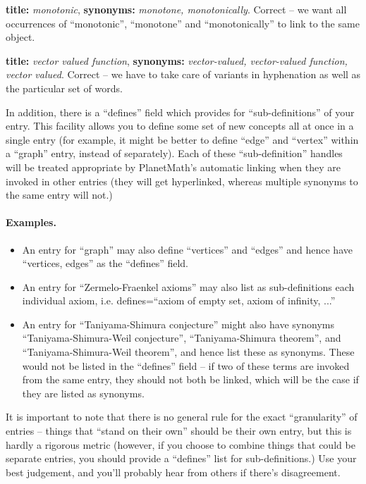 {\bf title:} \emph{monotonic}, {\bf synonyms:} \emph{monotone,
monotonically}. Correct -- we want all occurrences of ``monotonic'',
``monotone'' and ``monotonically'' to link to the same object.

{\bf title:} \emph{vector valued function}, {\bf synonyms:} \emph{vector-valued,
vector-valued function, vector valued}. Correct -- we have to take care
of variants in hyphenation as well as the particular set of words.

In addition, there is a ``defines'' field which provides for
``sub-definitions'' of your entry. This facility allows you to define
some set of new concepts all at once in a single entry (for example,
it might be better to define ``edge'' and ``vertex'' within a
``graph'' entry, instead of separately). Each of these
``sub-definition'' handles will be treated appropriate by PlanetMath's
automatic linking when they are invoked in other entries (they will
get hyperlinked, whereas multiple synonyms to the same entry will
not.)

\paragraph{Examples.}
\begin{itemize}
\item An entry for ``graph'' may also define ``vertices'' and
``edges'' and hence have ``vertices, edges'' as the ``defines''
field.
\item An entry for ``Zermelo-Fraenkel axioms'' may also list as
sub-definitions each individual axiom, i.e. defines=``axiom of empty
set, axiom of infinity, ...''
\item An entry for ``Taniyama-Shimura conjecture'' might also have
synonyms ``Taniyama-Shimura-Weil conjecture'', ``Taniyama-Shimura
theorem'', and ``Taniyama-Shimura-Weil theorem'', and hence list
these as synonyms. These would not be listed in the ``defines''
field -- if two of these terms are invoked from the same entry, they
should not both be linked, which will be the case if they are listed
as synonyms.
\end{itemize}
It is important to note that there is no general rule for the exact
``granularity'' of entries -- things that ``stand on their own''
should be their own entry, but this is hardly a rigorous metric
(however, if you choose to combine things that could be separate
entries, you should provide a ``defines'' list for sub-definitions.)
Use your best judgement, and you'll probably hear from others if
there's disagreement.

